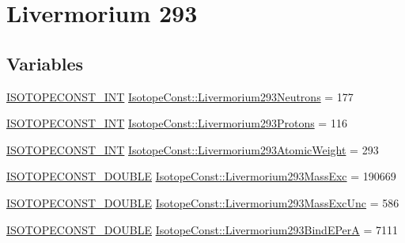 \hypertarget{group___isotope_const-_livermorium-_lv293}{}\section{Livermorium 293}
\label{group___isotope_const-_livermorium-_lv293}
\subsection*{Variables}
\begin{DoxyCompactItemize}
\item 
\mbox{\hyperlink{group___isotope_const-_macros_ga5f18360b3e99483a35c32d789e62621c}{I\+S\+O\+T\+O\+P\+E\+C\+O\+N\+S\+T\+\_\+\+I\+NT}} \mbox{\hyperlink{group___isotope_const-_livermorium-_lv293_ga5e347f39a67c7ce07ca8943988ee7a28}{Isotope\+Const\+::\+Livermorium293\+Neutrons}} = 177
\item 
\mbox{\hyperlink{group___isotope_const-_macros_ga5f18360b3e99483a35c32d789e62621c}{I\+S\+O\+T\+O\+P\+E\+C\+O\+N\+S\+T\+\_\+\+I\+NT}} \mbox{\hyperlink{group___isotope_const-_livermorium-_lv293_gadb7ed7242375f066381df564d00707a7}{Isotope\+Const\+::\+Livermorium293\+Protons}} = 116
\item 
\mbox{\hyperlink{group___isotope_const-_macros_ga5f18360b3e99483a35c32d789e62621c}{I\+S\+O\+T\+O\+P\+E\+C\+O\+N\+S\+T\+\_\+\+I\+NT}} \mbox{\hyperlink{group___isotope_const-_livermorium-_lv293_gab5b11adc84b57a9807a1242c1b228c96}{Isotope\+Const\+::\+Livermorium293\+Atomic\+Weight}} = 293
\item 
\mbox{\hyperlink{group___isotope_const-_macros_ga8f45a7272ce02c0b4c65c44636ed719a}{I\+S\+O\+T\+O\+P\+E\+C\+O\+N\+S\+T\+\_\+\+D\+O\+U\+B\+LE}} \mbox{\hyperlink{group___isotope_const-_livermorium-_lv293_ga8411332948fe8414f4a586f3546fdf1f}{Isotope\+Const\+::\+Livermorium293\+Mass\+Exc}} = 190669
\item 
\mbox{\hyperlink{group___isotope_const-_macros_ga8f45a7272ce02c0b4c65c44636ed719a}{I\+S\+O\+T\+O\+P\+E\+C\+O\+N\+S\+T\+\_\+\+D\+O\+U\+B\+LE}} \mbox{\hyperlink{group___isotope_const-_livermorium-_lv293_ga114a5d4b08a2ea54cc5c061557045ce0}{Isotope\+Const\+::\+Livermorium293\+Mass\+Exc\+Unc}} = 586
\item 
\mbox{\hyperlink{group___isotope_const-_macros_ga8f45a7272ce02c0b4c65c44636ed719a}{I\+S\+O\+T\+O\+P\+E\+C\+O\+N\+S\+T\+\_\+\+D\+O\+U\+B\+LE}} \mbox{\hyperlink{group___isotope_const-_livermorium-_lv293_ga86e5dc679a1d71e982ea8c679e9bd3ca}{Isotope\+Const\+::\+Livermorium293\+Bind\+E\+PerA}} = 7111

\end{DoxyCompactItemize}

